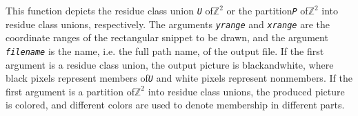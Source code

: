 \documentclass[a4paper,11pt]{report}
\begin{document}
{{{ This function depicts the residue class union \mbox{\texttt{\mdseries\slshape U}} of{\nobreakspace}${\ensuremath{\mathbb Z}}^2$ or the partition{\nobreakspace}\mbox{\texttt{\mdseries\slshape P}} of{\nobreakspace}${\ensuremath{\mathbb Z}}^2$ into residue class unions, respectively. The arguments \mbox{\texttt{\mdseries\slshape yrange}} and \mbox{\texttt{\mdseries\slshape xrange}} are the coordinate ranges of the rectangular snippet to be drawn, and the
argument \mbox{\texttt{\mdseries\slshape filename}} is the name, i.e. the full path name, of the output file. If the first
argument is a residue class union, the output picture is
black\texttt{}and\texttt{}white, where black pixels
represent members of{\nobreakspace}\mbox{\texttt{\mdseries\slshape U}} and white pixels represent non\texttt{}members. If the first
argument is a partition of{\nobreakspace}${\ensuremath{\mathbb Z}}^2$ into residue class unions, the produced picture is colored, and different
colors are used to denote membership in different parts. }

 }

  }

       
\end{document}
